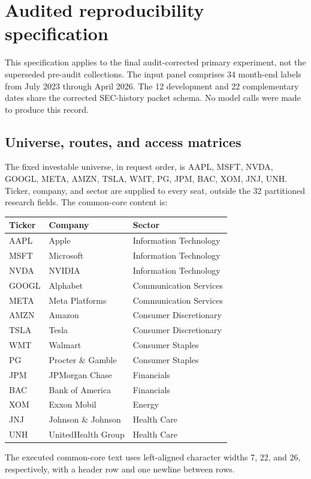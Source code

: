 \section{Audited reproducibility specification}
\label{app:reproducibility}
This specification applies to the final audit-corrected primary experiment,
not the superseded pre-audit collections. The input panel comprises 34
month-end labels from July 2023 through April 2026. The 12 development
and 22 complementary dates share the corrected SEC-history packet schema.
No model calls were made to produce this record.

\subsection{Universe, routes, and access matrices}
The fixed investable universe, in request order, is
AAPL, MSFT, NVDA, GOOGL, META, AMZN, TSLA, WMT, PG, JPM, BAC, XOM, JNJ, UNH.
Ticker, company, and sector are supplied to every seat, outside the 32
partitioned research fields. The common-core content is:
\begin{center}
\small
\begin{tabular}{@{}lll@{}}
\toprule
Ticker & Company & Sector \\
\midrule
AAPL & Apple & Information Technology \\
MSFT & Microsoft & Information Technology \\
NVDA & NVIDIA & Information Technology \\
GOOGL & Alphabet & Communication Services \\
META & Meta Platforms & Communication Services \\
AMZN & Amazon & Consumer Discretionary \\
TSLA & Tesla & Consumer Discretionary \\
WMT & Walmart & Consumer Staples \\
PG & Procter \& Gamble & Consumer Staples \\
JPM & JPMorgan Chase & Financials \\
BAC & Bank of America & Financials \\
XOM & Exxon Mobil & Energy \\
JNJ & Johnson \& Johnson & Health Care \\
UNH & UnitedHealth Group & Health Care \\
\bottomrule
\end{tabular}
\end{center}
The executed common-core text uses left-aligned character widths 7, 22,
and 26, respectively, with a header row and one newline between rows.

